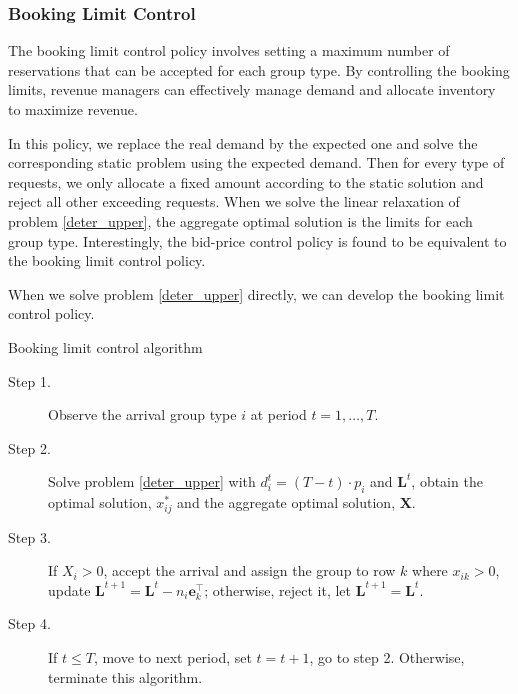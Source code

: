 \subsubsection{Booking Limit Control}
The booking limit control policy involves setting a maximum number of reservations that can be accepted for each group type. By controlling the booking limits, revenue managers can effectively manage demand and allocate inventory to maximize revenue.

In this policy, we replace the real demand by the expected one and solve the corresponding static problem using the expected demand. Then for every type of requests, we only allocate a fixed amount according to the static solution and reject all other exceeding requests. When we solve the linear relaxation of problem \eqref{deter_upper}, the aggregate optimal solution is the limits for each group type. Interestingly, the bid-price control policy is found to be equivalent to the booking limit control policy.

When we solve problem \eqref{deter_upper} directly, we can develop the booking limit control policy.

\begin{algorithm}[H]
  \caption{Booking limit control algorithm}
  \begin{description}
    \item[Step 1.] Observe the arrival group type $i$ at period $t = 1, \ldots, T$.
    \item[Step 2.] Solve problem \eqref{deter_upper} with $d_i^{t} = (T-t) \cdot p_i$ and $\mathbf{L}^{t}$, obtain the optimal solution, $x_{ij}^{*}$ and the aggregate optimal solution, $\mathbf{X}$.
    \item[Step 3.] If $X_{i} > 0$, accept the arrival and assign the group to row $k$ where $x_{ik} > 0$, update $\mathbf{L}^{t+1} = \mathbf{L}^{t} - n_i \mathbf{e}_{k}^{\top}$; otherwise, reject it, let $\mathbf{L}^{t+1} = \mathbf{L}^{t}$.
    \item[Step 4.] If $t \leq T$, move to next period, set $t = t+1$, go to step 2. Otherwise, terminate this algorithm.
  \end{description}
\end{algorithm}



